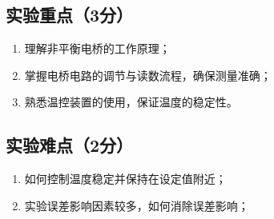 \documentclass[]{../template/Report}%
\begin{document}
\subsection{实验重点（3分）}
\begin{enumerate}
    \item 理解非平衡电桥的工作原理；
    \item 掌握电桥电路的调节与读数流程，确保测量准确；
    \item 熟悉温控装置的使用，保证温度的稳定性。
\end{enumerate}

\subsection{实验难点（2分）}
\begin{enumerate}
    \item 如何控制温度稳定并保持在设定值附近；
    \item 实验误差影响因素较多，如何消除误差影响；
\end{enumerate}
\end{document}
